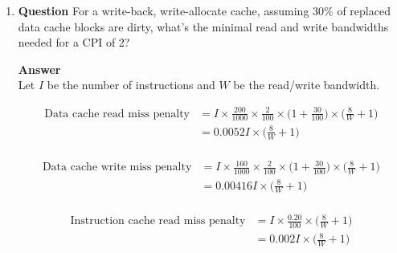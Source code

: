 \documentclass[10pt]{extarticle}
\begin{document}
\begin{enumerate}
\begin{enumerate}
            \item \textbf{Question} For a write-back, write-allocate cache,
            assuming 30\% of replaced data cache blocks are dirty, what’s the
            minimal read and write bandwidths needed for a CPI of 2?

            \textbf{Answer} \\ Let $I$ be the number of instructions and $W$ be
            the read/write bandwidth.

            \begin{equation*}
                \begin{split}
                    \text{Data cache read miss penalty} &
                    = I \times \frac{200}{1000} \times \frac{2}{100} \times
                    \bigg( 1+\frac{30}{100} \bigg) \times \bigg( \frac{8}{W} +
                    1 \bigg) \\
                    & = 0.0052I \times \bigg(\frac{8}{W} + 1\bigg) \\
                \end{split}
            \end{equation*}

            \begin{equation*}
                \begin{split}
                    \text{Data cache write miss penalty} &
                    = I \times \frac{160}{1000} \times \frac{2}{100} \times
                    \bigg( 1+\frac{30}{100} \bigg) \times \bigg( \frac{8}{W} +
                    1 \bigg) \\
                    & = 0.00416I \times \bigg(\frac{8}{W} + 1\bigg) \\
                \end{split}
            \end{equation*}

            \begin{equation*}
                \begin{split}
                    \text{Instruction cache read miss penalty} &
                    = I \times \frac{0.20}{100} \times \bigg(\frac{8}{W} +
                    1\bigg) \\
                    & = 0.002I \times \bigg(\frac{8}{W} + 1\bigg) \\
                \end{split}
            \end{equation*}


\end{enumerate}
\end{enumerate}
\end{document}
